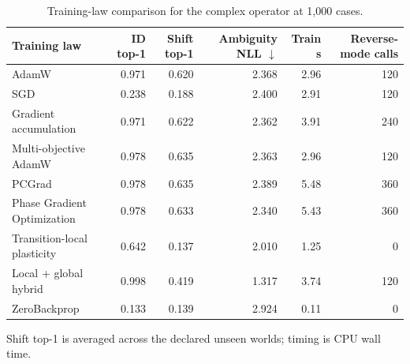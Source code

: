 \begin{table}[t]
\centering
\caption{Training-law comparison for the complex operator at 1,000 cases.}
\label{tab:training_laws}
\begin{tabular}{lrrrrr}
\toprule
Training law & ID top-1 & Shift top-1 & Ambiguity NLL $\downarrow$ & Train s & Reverse-mode calls \\
\midrule
AdamW & 0.971 & 0.620 & 2.368 & 2.96 & 120 \\
SGD & 0.238 & 0.188 & 2.400 & 2.91 & 120 \\
Gradient accumulation & 0.971 & 0.622 & 2.362 & 3.91 & 240 \\
Multi-objective AdamW & 0.978 & 0.635 & 2.363 & 2.96 & 120 \\
PCGrad & 0.978 & 0.635 & 2.389 & 5.48 & 360 \\
Phase Gradient Optimization & 0.978 & 0.633 & 2.340 & 5.43 & 360 \\
Transition-local plasticity & 0.642 & 0.137 & 2.010 & 1.25 & 0 \\
Local + global hybrid & 0.998 & 0.419 & 1.317 & 3.74 & 120 \\
ZeroBackprop & 0.133 & 0.139 & 2.924 & 0.11 & 0 \\
\bottomrule
\end{tabular}
\begin{minipage}{0.96\linewidth}\footnotesize Shift top-1 is averaged across the declared unseen worlds; timing is CPU wall time.\end{minipage}
\end{table}

